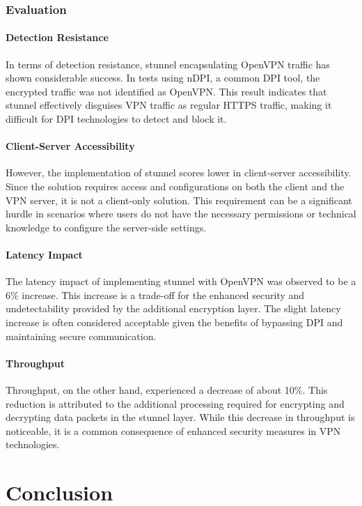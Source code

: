 \documentclass[12pt, fleqn, a4paper]{article}
\begin{document}
\subsubsection{Evaluation}
\paragraph{Detection Resistance}
In terms of detection resistance, stunnel encapsulating OpenVPN traffic has shown considerable success. In tests using nDPI, a common DPI tool, the encrypted traffic was not identified as OpenVPN. This result indicates that stunnel effectively disguises VPN traffic as regular HTTPS traffic, making it difficult for DPI technologies to detect and block it.

\paragraph{Client-Server Accessibility}
However, the implementation of stunnel scores lower in client-server accessibility. Since the solution requires access and configurations on both the client and the VPN server, it is not a client-only solution. This requirement can be a significant hurdle in scenarios where users do not have the necessary permissions or technical knowledge to configure the server-side settings.

\paragraph{Latency Impact}
The latency impact of implementing stunnel with OpenVPN was observed to be a 6\% increase. This increase is a trade-off for the enhanced security and undetectability provided by the additional encryption layer. The slight latency increase is often considered acceptable given the benefits of bypassing DPI and maintaining secure communication.

\paragraph{Throughput}
Throughput, on the other hand, experienced a decrease of about 10\%. This reduction is attributed to the additional processing required for encrypting and decrypting data packets in the stunnel layer. While this decrease in throughput is noticeable, it is a common consequence of enhanced security measures in VPN technologies.

\section*{\centering Conclusion}
\end{document}
